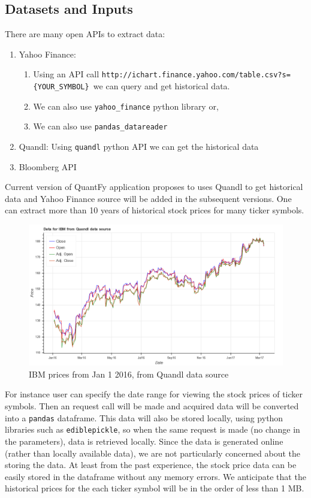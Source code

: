 \documentclass[12pt]{article}
\begin{document}
\begin{itemize}
\section{Datasets and Inputs} 
\label{sec:datasets}
There are many open APIs to extract data:
\begin{enumerate}
\item Yahoo Finance:
\begin{enumerate}
\item Using an API call  \texttt{http://ichart.finance.yahoo.com/table.csv?s=\{YOUR\_SYMBOL\} }we can query and get historical data.
\item We can also use \texttt{yahoo\_finance} python library or,
\item We can also use \texttt{pandas\_datareader}
\end{enumerate}
\item Quandl: Using \texttt{quandl} python API we can get the historical data
\item Bloomberg API
\end{enumerate}
Current version of QuantFy application proposes to uses Quandl to get historical data and Yahoo Finance source will be added in the subsequent versions. One can extract more than 10 years of historical stock prices for many ticker symbols. 

\begin{figure}[!htbp]
\begin{center}
\includegraphics[height=0.5\textheight,width=\textwidth]{price_plot_IBM.png}
\caption{IBM prices from Jan 1 2016, from Quandl data source}
\label{fig:ibm_price}
\end{center}
\end{figure}

For instance user can specify the date range for viewing the stock prices of ticker symbols. Then an request call will be made and acquired data will be converted into a \texttt{pandas}  dataframe. This data will also be stored locally, using python libraries such as \texttt{ediblepickle}, so when the same request is made (no change in the parameters), data is retrieved locally. Since the data is generated online (rather than locally available data), we are not particularly concerned about the storing the data. At least from the past experience, the stock price data can be easily stored in the dataframe without any memory errors. We anticipate that the historical prices for the each ticker symbol will be in the order of less than 1 MB.


\end{itemize}
\end{document}
